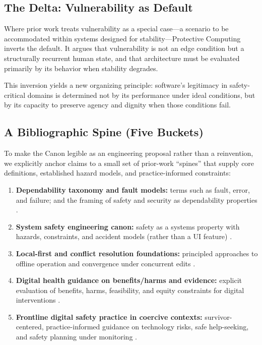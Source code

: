 \documentclass[12pt]{article}
\begin{document}
\subsection{The Delta: Vulnerability as Default}
Where prior work treats vulnerability as a special case---a scenario to be accommodated within systems designed for stability---Protective Computing inverts the default. It argues that vulnerability is not an edge condition but a structurally recurrent human state, and that architecture must be evaluated primarily by its behavior when stability degrades.

This inversion yields a new organizing principle: software's legitimacy in safety-critical domains is determined not by its performance under ideal conditions, but by its capacity to preserve agency and dignity when those conditions fail.

\subsection{A Bibliographic Spine (Five Buckets)}
To make the Canon legible as an engineering proposal rather than a reinvention, we explicitly anchor claims to a small set of prior-work ``spines'' that supply core definitions, established hazard models, and practice-informed constraints:

\begin{enumerate}
\item \textbf{Dependability taxonomy and fault models:} terms such as fault, error, and failure; and the framing of safety and security as dependability properties \cite{avizienis2004dependability}.
\item \textbf{System safety engineering canon:} safety as a systems property with hazards, constraints, and accident models (rather than a UI feature) \cite{leveson1995safeware}.
\item \textbf{Local-first and conflict resolution foundations:} principled approaches to offline operation and convergence under concurrent edits \cite{shapiro2011crdt,kleppmann2019localfirst}.
\item \textbf{Digital health guidance on benefits/harms and evidence:} explicit evaluation of benefits, harms, feasibility, and equity constraints for digital interventions \cite{who2019digitalinterventions,who2020digitalhealthstrategy,iom2012healthit}.
\item \textbf{Frontline digital safety practice in coercive contexts:} survivor-centered, practice-informed guidance on technology risks, safe help-seeking, and safety planning under monitoring \cite{nnedv_safetynet_survivors_ai_guide,coalition_against_stalkerware_survivors}.
\end{enumerate}
\end{document}
